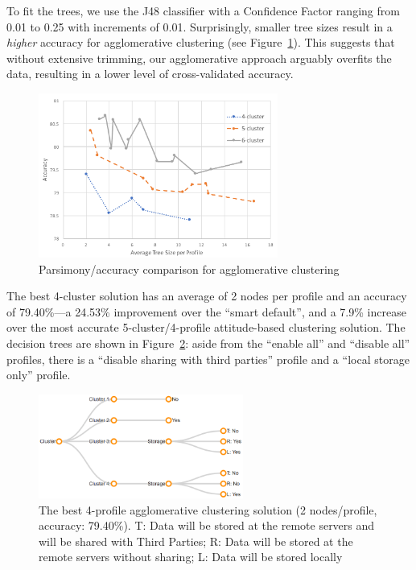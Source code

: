 To fit the trees, we use the J48 classifier with a Confidence Factor ranging from 0.01 to 0.25 with increments of 0.01. Surprisingly, smaller tree sizes result in a \emph{higher} accuracy for agglomerative clustering (see Figure~\ref{fig:conglosum}). This suggests that without extensive trimming, our agglomerative approach arguably overfits the data, resulting in a lower level of cross-validated accuracy.

\begin{figure}
	\centering
	\includegraphics[width=0.7\textwidth]{figures/congloSum2.pdf}
	\caption{Parsimony/accuracy comparison for agglomerative clustering}
	\label{fig:conglosum}
\end{figure}

The best 4-cluster solution has an average of 2 nodes per profile and an accuracy of 79.40\%---a 24.53\% improvement over the ``smart default'', and a 7.9\% increase over the most accurate 5-cluster/4-profile attitude-based clustering solution. The decision trees are shown in Figure~\ref{fig:conglo_4_profile001}: aside from the ``enable all'' and ``disable all'' profiles, there  is a ``disable sharing with third parties'' profile and a ``local storage only'' profile.

\begin{figure}
	\centering
	\includegraphics[width=0.6\textwidth]{figures/conglo_4_profile001.png}
	\caption{The best 4-profile agglomerative clustering solution (2 nodes/profile, accuracy: 79.40\%). T: Data will be stored at the remote servers and will be shared with Third Parties; R: Data will be stored at the remote servers without sharing; L: Data will be stored locally}
	\label{fig:conglo_4_profile001}
\end{figure}

